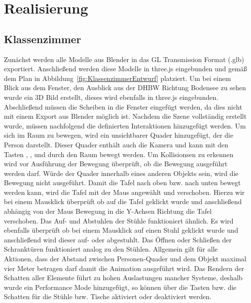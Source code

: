 \section{Realisierung}
\subsection{Klassenzimmer}
Zunächst werden alle Modelle aus Blender in das GL Transmission Format (.glb) exportiert.
Anschließend werden diese Modelle in three.js eingebunden und gemäß dem Plan in Abbildung~\ref{fig:KlassenzimmerEntwurf}
platziert.
Um bei einem Blick aus dem Fenster, den Ausblick aus der DHBW Richtung Bodensee zu sehen wurde ein 3D Bild erstellt,
dieses wird ebenfalls in three.js eingebunden.
Abschließend müssen die Scheiben in die Fenster eingefügt werden, da dies nicht mit einem Export aus Blender möglich ist.
\newparagraph
Nachdem die Szene vollständig erstellt wurde, müssen nachfolgend die definierten Interaktionen hinzugefügt werden.
Um sich im Raum zu bewegen, wird ein unsichtbarer Quader hinzugefügt, der die Person darstellt. Dieser Quader enthält auch die Kamera
und kann mit den Tasten , ,  und  durch den Raum bewegt werden. Um Kollisionsen zu erkennen wird vor Ausführung der Bewegung überprüft,
ob die Bewegung ausgeführt werden darf. 
Würde der Quader innerhalb eines anderen Objekts sein, wird die Bewegung nicht ausgeführt.
\newparagraph
Damit die Tafel nach oben bzw. nach unten bewegt werden kann, wird die Tafel mit der Maus angewählt und verschoben.
Hierzu wir bei einem Mausklick überprüft ob auf die Tafel geklickt wurde und anschließend abhängig von der Maus Bewegung in die Y-Achsen Richtung die Tafel verschoben.
Das Auf- und Abstuhlen der Stühle funktioniert ähnlich. Es wird ebenfalls überprüft ob bei einem Mausklick auf einen Stuhl geklickt wurde und anschließend wird dieser auf- oder abgestuhlt.
Das Öffnen oder Schließen der Schranktüren funktioniert analog zu den Stühlen.
Allgemein gilt für alle Aktionen, dass der Abstand zwischen Personen-Quader und dem Objekt maximal vier Meter betragen darf damit die Animation ausgeführt wird.
\newparagraph
Das Rendern der Schatten aller Elemente führt zu hohen Auslastungen mancher Systeme, deshalb wurde ein Performance Mode hinzugefügt, so können über die Tasten  bzw. 
die Schatten für die Stühle bzw. Tische aktiviert oder deaktiviert werden.
